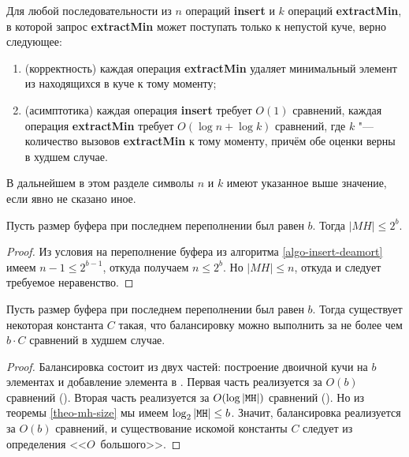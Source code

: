 \begin{theorem} \label{theo-fast-correct}
Для любой последовательности из
$n$ операций \textbf{insert} и $k$ операций \textbf{extractMin},
в которой запрос \textbf{extractMin} может поступать только к непустой
куче, верно следующее:
\begin{enumerate}
\item (корректность) каждая операция \textbf{extractMin} удаляет минимальный элемент
из находящихся в куче к тому моменту;
\item (асимптотика) каждая операция \textbf{insert} требует $O(1)$ сравнений,
каждая операция \textbf{extractMin} требует $O(\log n + \log k)$ сравнений,
где $k$ "--- количество вызовов \textbf{extractMin} к тому моменту, причём
обе оценки верны в худшем случае.
\end{enumerate}
\end{theorem}

\bigskip

В дальнейшем в этом разделе символы $n$ и $k$ имеют указанное выше значение,
если явно не сказано иное.

\begin{lem} \label{theo-mh-size}
Пусть размер буфера при последнем переполнении был равен $b$. Тогда $|MH| \leq 2^b$.
\end{lem}
\begin{proof}
Из условия на переполнение буфера из алгоритма \ref{algo-insert-deamort} имеем
$n-1 \leq 2^{b-1}$, откуда получаем $n \leq 2^b$. Но $|MH| \leq n$, откуда
и следует требуемое неравенство.
\end{proof}

\begin{lem}\label{theo-balancing-constant}
Пусть размер буфера при последнем переполнении был равен $b$.
Тогда существует некоторая константа $C$ такая,
что балансировку можно выполнить за не более чем $b\cdot C$ сравнений в худшем случае.
\end{lem}
\begin{proof}
Балансировка состоит из двух частей: построение двоичной кучи на $b$ элементах
и добавление элемента в \MH. Первая часть реализуется за $O(b)$ сравнений (\cite{Cormen}).
Вторая часть реализуется за $O(\log |\MH|)$ сравнений (\cite{Cormen}). Но из
теоремы \ref{theo-mh-size} мы имеем $\log_2 |\MH| \leq b$. Значит, балансировка
реализуется за $O(b)$ сравнений, и существование искомой константы $C$ следует
из определения <<$O$~большого>>.
\end{proof}

